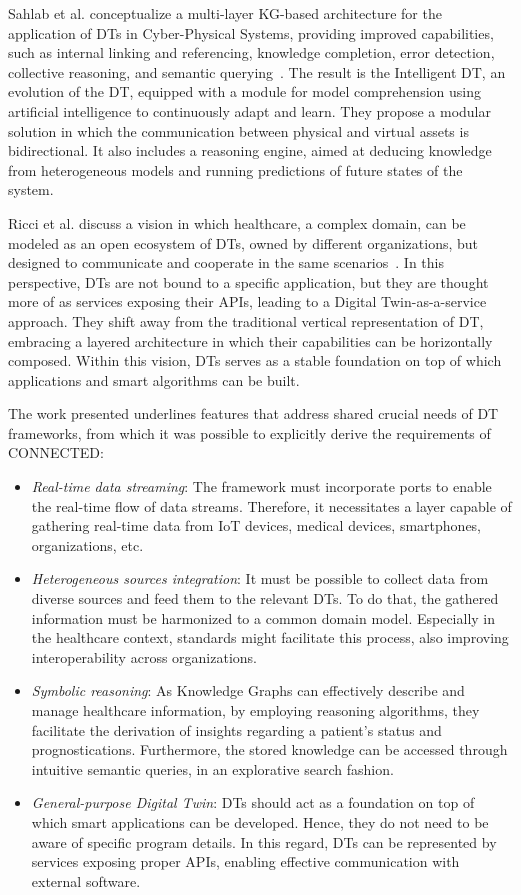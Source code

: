 Sahlab et al. conceptualize a multi-layer KG-based architecture for the application of DTs in Cyber-Physical Systems, providing improved capabilities, such as internal linking and referencing, knowledge completion, error detection, collective reasoning, and semantic querying~\cite{sahlab_knowledge_2021}. The result is the Intelligent DT, an evolution of the DT, equipped with a module for model comprehension using artificial intelligence to continuously adapt and learn. They propose a modular solution in which the communication between physical and virtual assets is bidirectional. It also includes a reasoning engine, aimed at deducing knowledge from heterogeneous models and running predictions of future states of the system. 

Ricci et al. discuss a vision in which healthcare, a complex domain, can be modeled as an open ecosystem of DTs, owned by different organizations, but designed to communicate and cooperate in the same scenarios~\cite{9325551_ricci}. In this perspective, DTs are not bound to a specific application, but they are thought more of as services exposing their APIs, leading to a Digital Twin-as-a-service approach. They shift away from the traditional vertical representation of DT, embracing a layered architecture in which their capabilities can be horizontally composed. Within this vision, DTs serves as a stable foundation on top of which applications and smart algorithms can be built. 

The work presented underlines features that address shared crucial needs of DT frameworks, from which it was possible to explicitly derive the requirements of CONNECTED: 

\begin{itemize}
    \item \textit{Real-time data streaming}: The framework must incorporate ports to enable the real-time flow of data streams. Therefore, it necessitates a layer capable of gathering real-time data from IoT devices, medical devices, smartphones, organizations, etc. 
    \item \textit{Heterogeneous sources integration}: It must be possible to collect data from diverse sources and feed them to the relevant DTs. To do that, the gathered information must be harmonized to a common domain model. Especially in the healthcare context, standards might facilitate this process, also improving interoperability across organizations.  
    \item \textit{Symbolic reasoning}: As Knowledge Graphs can effectively describe and manage healthcare information, by employing reasoning algorithms, they facilitate the derivation of insights regarding a patient's status and prognostications. Furthermore, the stored knowledge can be accessed through intuitive semantic queries, in an explorative search fashion. 
    \item \textit{General-purpose Digital Twin}: DTs should act as a foundation on top of which smart applications can be developed. Hence, they do not need to be aware of specific program details. In this regard, DTs can be represented by services exposing proper APIs, enabling effective communication with external software. 
\end{itemize}

